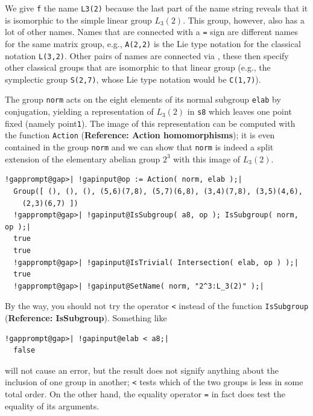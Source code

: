 \documentclass[a4paper,11pt]{report}
\begin{document}
{{ We give \texttt{f} the name \texttt{L{\textunderscore}3(2)} because the last part of the name string reveals that it is isomorphic to the
simple linear group $L_3(2)$. This group, however, also has a lot of other names. Names that are connected
with a \texttt{=} sign are different names for the same matrix group, e.g., \texttt{A(2,2)} is the Lie type notation for the classical notation \texttt{L(3,2)}. Other pairs of names are connected via \texttt{\texttt{}}, these then specify other classical groups that are isomorphic to that linear
group (e.g., the symplectic group \texttt{S(2,7)}, whose Lie type notation would be \texttt{C(1,7)}). 

 The group \texttt{norm} acts on the eight elements of its normal subgroup \texttt{elab} by conjugation, yielding a representation of $L_3(2)$ in \texttt{s8} which leaves one point fixed (namely point{\nobreakspace}\texttt{1}). The image of this representation can be computed with the function \texttt{Action} (\textbf{Reference: Action homomorphisms}); it is even contained in the group \texttt{norm} and we can show that \texttt{norm} is indeed a split extension of the elementary abelian group $2^3$ with this image of $L_3(2)$. 

 
\begin{Verbatim}[commandchars=!@|,fontsize=\small,frame=single,label=Example]
  !gapprompt@gap>| !gapinput@op := Action( norm, elab );|
  Group([ (), (), (), (5,6)(7,8), (5,7)(6,8), (3,4)(7,8), (3,5)(4,6),
    (2,3)(6,7) ])
  !gapprompt@gap>| !gapinput@IsSubgroup( a8, op ); IsSubgroup( norm, op );|
  true
  true
  !gapprompt@gap>| !gapinput@IsTrivial( Intersection( elab, op ) );|
  true
  !gapprompt@gap>| !gapinput@SetName( norm, "2^3:L_3(2)" );|
\end{Verbatim}
 

 By the way, you should not try the operator \texttt{{\textless}} instead of the function \texttt{IsSubgroup} (\textbf{Reference: IsSubgroup}). Something like 

 
\begin{Verbatim}[commandchars=!@|,fontsize=\small,frame=single,label=Example]
  !gapprompt@gap>| !gapinput@elab < a8;|
  false
\end{Verbatim}
 

 will not cause an error, but the result does not signify anything about the
inclusion of one group in another; \texttt{{\textless}} tests which of the two groups is less in some total order. On the other hand,
the equality operator \texttt{=} in fact does test the equality of its arguments. 

}}
\end{document}
